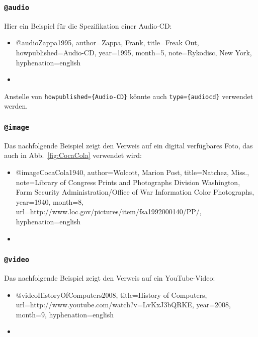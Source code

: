 \subsubsection{\texttt{@audio}}
\label{sec:@audio}
Hier ein Beispiel für die Spezifikation einer Audio-CD:
%
\begin{itemize}
\item[] 
\begin{GenericCode}[numbers=none]
@audio{Zappa1995,
  author={Zappa, Frank},
  title={Freak Out},
  howpublished={Audio-CD},
  year={1995},
  month={5},
  note={Rykodisc, New York},
  hyphenation={english}
}
\end{GenericCode}
\item[\cite{Zappa1995}] 
\end{itemize}
%
Anstelle von \verb!howpublished={Audio-CD}! könnte auch \verb!type={audiocd}! verwendet werden.


\subsubsection{\texttt{@image}}
\label{sec:@image}

Das nachfolgende Beispiel zeigt den Verweis auf ein digital verfügbares Foto,
das auch in Abb.\ \ref{fig:CocaCola} verwendet wird:
%
\begin{itemize}
\item[] 
\begin{GenericCode}[numbers=none]
@image{CocaCola1940,
  author={Wolcott, Marion Post},
	title={Natchez, Miss.},
	note={Library of Congress Prints and Photographs Division Washington, Farm Security Administration/Office of War Information Color Photographs},
	year={1940},
	month={8},
	url={http://www.loc.gov/pictures/item/fsa1992000140/PP/},
  hyphenation={english}
 }
\end{GenericCode}
\item[\cite{CocaCola1940}] 
\end{itemize}





\subsubsection{\texttt{@video}}
\label{sec:@video}

Das nachfolgende Beispiel zeigt den Verweis auf ein YouTube-Video:
%
\begin{itemize}
\item[]
\begin{GenericCode}[numbers=none]
@video{HistoryOfComputers2008,
  title={History of Computers},
	url={http://www.youtube.com/watch?v=LvKxJ3bQRKE},
  year={2008},
  month={9},
  hyphenation={english}
}
\end{GenericCode}
\item[\cite{HistoryOfComputers2008}] 
\end{itemize}

